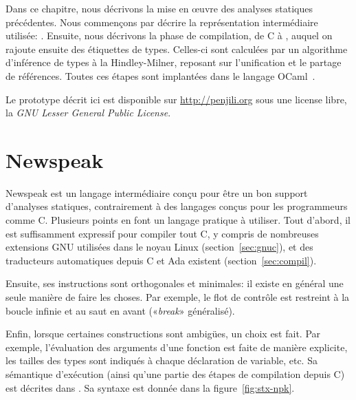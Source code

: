 Dans ce chapitre, nous décrivons la mise en œuvre des analyses statiques
précédentes. Nous commençons par décrire la représentation intermédiaire
utilisée: \newspeak. Ensuite, nous décrivons la phase de compilation, de C à
\newspeak, auquel on rajoute ensuite des étiquettes de types. Celles-ci sont
calculées par un algorithme d'inférence de types à la Hindley-Milner, reposant
sur l'unification et le partage de références. Toutes ces étapes sont implantées
dans le langage OCaml~\cite{DAOC}.

Le prototype décrit ici est disponible sur \url{http://penjili.org} sous une
license libre, la \emph{GNU Lesser General Public License}.

\section{Newspeak}
\label{sec:npk}

Newspeak est un langage intermédiaire conçu pour être un bon support d'analyses
statiques, contrairement à des langages conçus pour les programmeurs comme C.
Plusieurs points en font un langage pratique à utiliser. Tout d'abord, il est
suffisamment expressif pour compiler tout C, y compris de nombreuses extensions
GNU utilisées dans le noyau Linux (section~\ref{sec:gnuc}), et des traducteurs
automatiques depuis C et Ada existent (section~\ref{sec:compil}).

Ensuite, ses instructions sont orthogonales et minimales: il existe en général
une seule manière de faire les choses. Par exemple, le flot de contrôle est
restreint à la boucle infinie et au saut en avant («\emph{break}» généralisé).

Enfin, lorsque certaines constructions sont ambigües, un choix est fait. Par
exemple, \linebreak l'évaluation des arguments d'une fonction est faite de
manière explicite, les tailles des types sont indiqués à chaque déclaration de
variable, etc. Sa sémantique d'exécution (ainsi qu'une partie des étapes de
compilation depuis C) est décrites dans \cite{newspeak}. Sa syntaxe est donnée
dans la figure~\ref{fig:stx-npk}.

